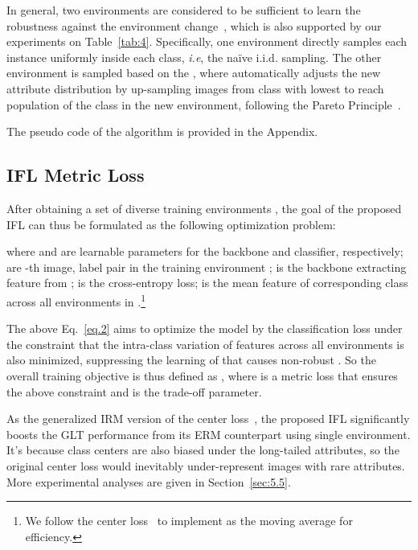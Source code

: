 \documentclass{article}
\def\ie{\emph{i.e}} \def\Ie{\emph{I.e}}
\begin{document}
In general, two environments are considered to be sufficient to learn the robustness against the environment change~\cite{arjovsky2019invariant}, which is also supported by our experiments on Table~\ref{tab:4}. Specifically, one environment directly samples each instance uniformly inside each class, \ie, the na\"ive i.i.d. sampling. The other environment is sampled based on the , where  automatically adjusts the new attribute distribution by up-sampling  images from class  with lowest  to reach  population of the class  in the new environment, following the Pareto Principle~\cite{reed2001pareto}. 

The pseudo code of the algorithm is provided in the Appendix.




\subsection{IFL Metric Loss}

After obtaining a set of diverse training environments , the goal of the proposed IFL can thus be formulated as the following optimization problem:

where  and  are learnable parameters for the backbone and classifier, respectively;  are -th image, label pair in the training environment ;  is the backbone extracting feature from ;  is the cross-entropy loss;   is the mean feature of corresponding class  across all environments in .\footnote{We follow the center loss~\cite{wen2016centerloss} to implement  as the moving average for efficiency.}



The above Eq.~\eqref{eq.2} aims to optimize the model by the classification loss  under the constraint that the intra-class variation of features across all environments is also minimized, suppressing the learning of  that causes non-robust . So the overall training objective is thus defined as , where  is a metric loss that ensures the above constraint and  is the trade-off parameter. 

As the generalized IRM version of the center loss~\cite{wen2016centerloss}, the proposed IFL significantly boosts the GLT performance from its ERM counterpart using single environment. It's because class centers are also biased under the long-tailed attributes, so the original center loss would inevitably under-represent images with rare attributes.  More experimental analyses are given in Section~\ref{sec:5.5}. 
\end{document}
